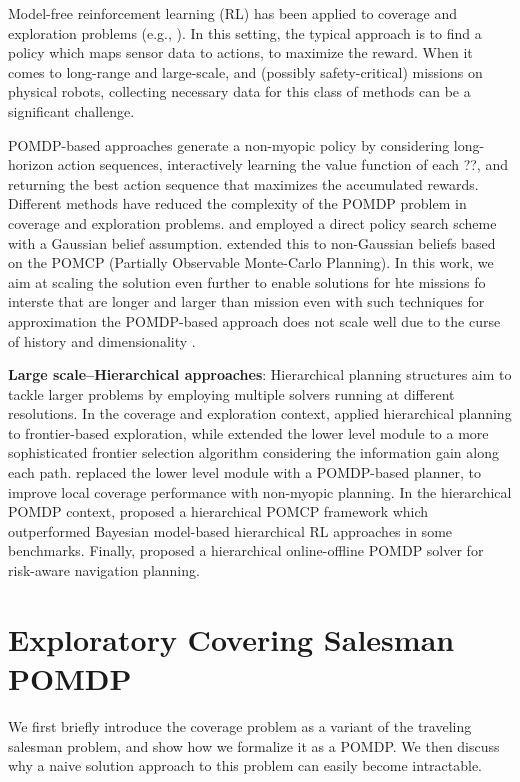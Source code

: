 \documentclass{article}
\newcommand{\ph}[1]{{\textbf{#1}:}} %
\begin{document}
Model-free reinforcement learning (RL) has been applied to coverage and exploration problems (e.g., \cite{pathak_icm, rnd,burda2018study,ECR2018}). In this setting, the typical approach is to find a policy which maps sensor data to actions, to maximize the reward. When it comes to long-range and large-scale, and (possibly safety-critical) missions on physical robots, collecting necessary data for this class of methods can be a significant challenge.

POMDP-based approaches generate a non-myopic policy by considering long-horizon action sequences, interactively learning the value function of each ??, and returning the best action sequence that maximizes the accumulated rewards. Different methods have reduced the complexity of the POMDP problem in coverage and exploration problems. \citet{indelman2015planning} and \citet{martinez2009bayesian} employed a direct policy search scheme with a Gaussian belief assumption.  \citet{Lauri2016planning} extended this to non-Gaussian beliefs based on the POMCP (Partially Observable Monte-Carlo Planning). %
In this work, we aim at scaling the solution even further to enable solutions for hte missions fo interste that are longer and larger than mission even with such techniques for approximation the POMDP-based approach does not scale well due to the curse of history and dimensionality \cite{Pineau03}.

\ph{Large scale--Hierarchical approaches}
Hierarchical planning structures aim to tackle larger problems by employing multiple solvers running at different resolutions.  
%
In the coverage and exploration context, \citet{umari2017autonomous} applied hierarchical planning to frontier-based exploration, while  \cite{dang2019explore} extended the lower level module to a more sophisticated frontier selection algorithm considering the information gain along each path.  \citet{Lauri2016planning} replaced the lower level module with a POMDP-based planner, to improve local coverage performance with non-myopic planning.
In the hierarchical POMDP context, \citet{vien2015hierarchical} proposed a hierarchical POMCP framework which outperformed Bayesian model-based hierarchical RL approaches in some benchmarks.  Finally, \cite{kim2019bi} proposed a hierarchical online-offline POMDP solver for risk-aware navigation planning.

\section{Exploratory Covering Salesman POMDP}
\label{sec:ECSPasPOMDP}
We first briefly introduce the coverage problem as a variant of the traveling salesman problem, and show how we formalize it as a POMDP. We then discuss why a naive solution approach to this problem can easily become intractable.  
\end{document}
